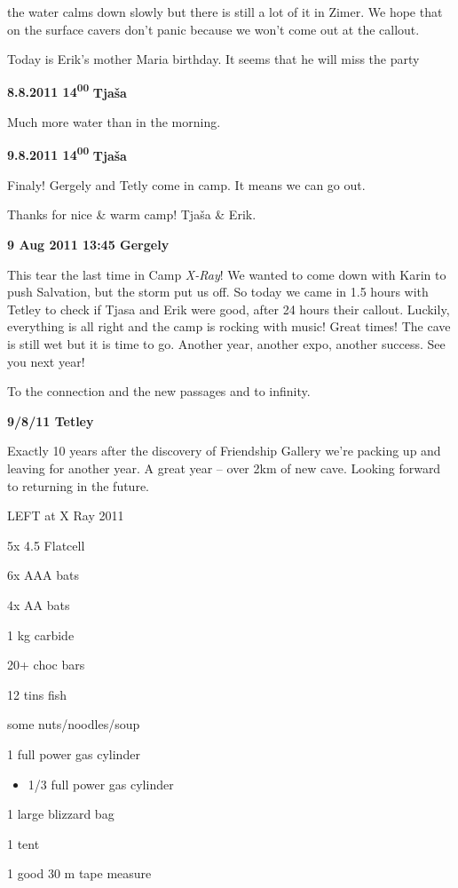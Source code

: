 the water calms down slowly but there is still a lot of it in Zimer. We
hope that on the surface cavers don't panic because we won't come out at
the callout.

Today is Erik's mother Maria birthday. It seems that he will miss the
party

\textbf{8.8.2011 14\textsuperscript{00}} \textbf{Tjaša}

Much more water than in the morning.

\textbf{9.8.2011 14\textsuperscript{00}} \textbf{Tjaša}

Finaly! Gergely and Tetly come in camp. It means we can go out.

Thanks for nice \& warm camp! Tjaša \& Erik.

\textbf{9 Aug 2011 13:45 Gergely}

This tear the last time in Camp \emph{X-Ray}! We wanted to come down
with Karin to push Salvation, but the storm put us off. So today we came
in 1.5 hours with Tetley to check if Tjasa and Erik were good, after 24
hours their callout. Luckily, everything is all right and the camp is
rocking with music! Great times! The cave is still wet but it is time to
go. Another year, another expo, another success. See you next year!

To the connection and the new passages and to infinity.

\textbf{9/8/11 Tetley}

Exactly 10 years after the discovery of Friendship Gallery we're packing
up and leaving for another year. A great year -- over 2km of new cave.
Looking forward to returning in the future.

LEFT at X Ray 2011

5x 4.5 Flatcell

6x AAA bats

4x AA bats

1 kg carbide

20+ choc bars

12 tins fish

some nuts/noodles/soup

1 full power gas cylinder

\begin{itemize}
\tightlist
\item
  1/3 full power gas cylinder
\end{itemize}

1 large blizzard bag

1 tent

1 good 30 m tape measure

